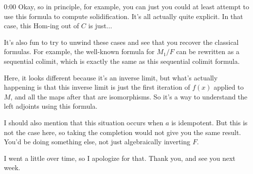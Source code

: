\begin{unfinished}{0:00}
Okay, so in principle, for example, you can just you could at least attempt to use this formula to compute solidification. It's all actually quite explicit. In that case, this $\text{Hom}$-ing out of $C$ is just...

It's also fun to try to unwind these cases and see that you recover the classical formulas. For example, the well-known formula for $M_1/F$ can be rewritten as a sequential colimit, which is exactly the same as this sequential colimit formula. 

Here, it looks different because it's an inverse limit, but what's actually happening is that this inverse limit is just the first iteration of $f(x)$ applied to $M$, and all the maps after that are isomorphisms. So it's a way to understand the left adjoints using this formula.

I should also mention that this situation occurs when $a$ is idempotent. But this is not the case here, so taking the completion would not give you the same result. You'd be doing something else, not just algebraically inverting $F$. 

I went a little over time, so I apologize for that. Thank you, and see you next week.
\end{unfinished}